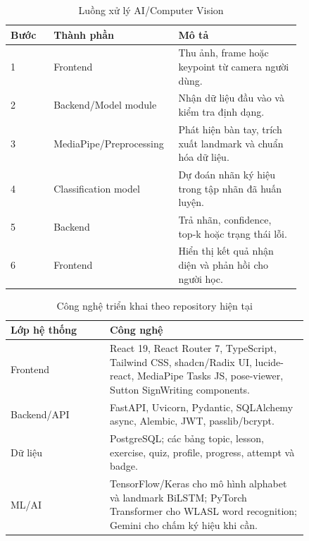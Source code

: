 \documentclass[conference]{IEEEtran}
\begin{document}
\begin{table}[htbp]
\caption{Luồng xử lý AI/Computer Vision}
\begin{center}
\footnotesize
\begin{tabular}{|p{0.14\linewidth}|p{0.28\linewidth}|p{0.40\linewidth}|}
\hline
\textbf{Bước} & \textbf{Thành phần} & \textbf{Mô tả} \\
\hline
1 & Frontend & Thu ảnh, frame hoặc keypoint từ camera người dùng. \\
\hline
2 & Backend/Model module & Nhận dữ liệu đầu vào và kiểm tra định dạng. \\
\hline
3 & MediaPipe/Preprocessing & Phát hiện bàn tay, trích xuất landmark và chuẩn hóa dữ liệu. \\
\hline
4 & Classification model & Dự đoán nhãn ký hiệu trong tập nhãn đã huấn luyện. \\
\hline
5 & Backend & Trả nhãn, confidence, top-k hoặc trạng thái lỗi. \\
\hline
6 & Frontend & Hiển thị kết quả nhận diện và phản hồi cho người học. \\
\hline
\end{tabular}
\label{tab:aiflow}
\end{center}
\end{table}

\begin{table}[htbp]
\caption{Công nghệ triển khai theo repository hiện tại}
\begin{center}
\footnotesize
\begin{tabular}{|p{0.28\linewidth}|p{0.56\linewidth}|}
\hline
\textbf{Lớp hệ thống} & \textbf{Công nghệ} \\
\hline
Frontend & React 19, React Router 7, TypeScript, Tailwind CSS, shadcn/Radix UI, lucide-react, MediaPipe Tasks JS, pose-viewer, Sutton SignWriting components. \\
\hline
Backend/API & FastAPI, Uvicorn, Pydantic, SQLAlchemy async, Alembic, JWT, passlib/bcrypt. \\
\hline
Dữ liệu & PostgreSQL; các bảng topic, lesson, exercise, quiz, profile, progress, attempt và badge. \\
\hline
ML/AI & TensorFlow/Keras cho mô hình alphabet và landmark BiLSTM; PyTorch Transformer cho WLASL word recognition; Gemini cho chấm ký hiệu khi cần. \\
\hline
\end{tabular}
\label{tab:tech}
\end{center}
\end{table}
\end{document}
